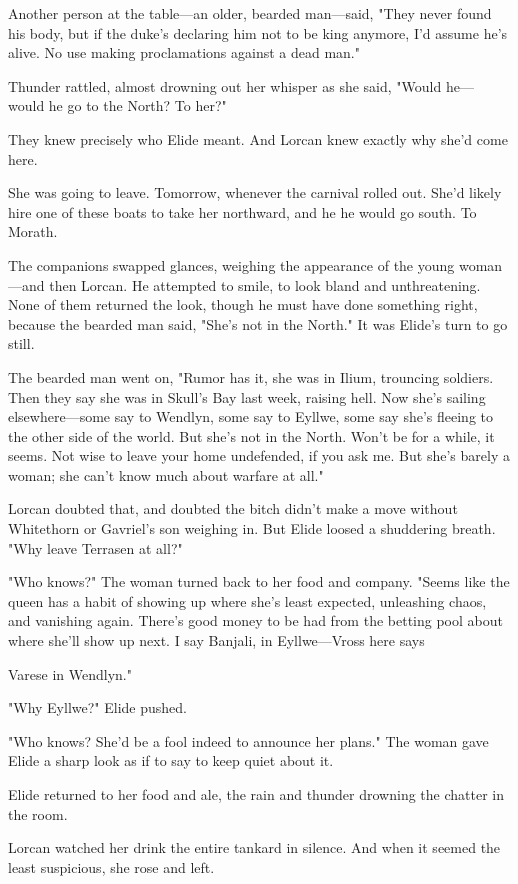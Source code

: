Another person at the table---an older, bearded man---said, "They never found his body, but if the duke's declaring him not to be king anymore, I'd assume he's alive. No use making proclamations against a dead man."

Thunder rattled, almost drowning out her whisper as she said, "Would he--- would he go to the North? To  her?"

They knew precisely who Elide meant. And Lorcan knew exactly why she'd come here.

She was going to leave. Tomorrow, whenever the carnival rolled out. She'd likely hire one of these boats to take her northward, and he
 he would go south. To Morath.

The companions swapped glances, weighing the appearance of the young woman---and then Lorcan. He attempted to smile, to look bland and unthreatening. None of them returned the look, though he must have done something right, because the bearded man said, "She's not in the North." It was Elide's turn to go still.

The bearded man went on, "Rumor has it, she was in Ilium, trouncing soldiers. Then they say she was in Skull's Bay last week, raising hell. Now she's sailing elsewhere---some say to Wendlyn, some say to Eyllwe, some say she's fleeing to the other side of the world. But she's not in the North. Won't be for a while, it seems. Not wise to leave your home undefended, if you ask me. But she's barely a woman; she can't know much about warfare at all."

Lorcan doubted that, and doubted the bitch didn't make a move without Whitethorn or Gavriel's son weighing in. But Elide loosed a shuddering breath. "Why leave Terrasen at all?"

"Who knows?" The woman turned back to her food and company. "Seems like the queen has a habit of showing up where she's least expected, unleashing chaos, and vanishing again. There's good money to be had from the betting pool about where she'll show up next. I say Banjali, in Eyllwe---Vross here says

Varese in Wendlyn."

"Why Eyllwe?" Elide pushed.

"Who knows? She'd be a fool indeed to announce her plans." The woman gave Elide a sharp look as if to say to keep quiet about it.

Elide returned to her food and ale, the rain and thunder drowning the chatter in the room.

Lorcan watched her drink the entire tankard in silence. And when it seemed the least suspicious, she rose and left.

